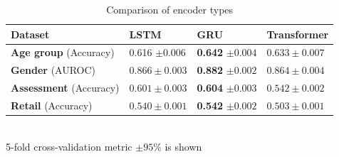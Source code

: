 \documentclass{article}
\begin{document}
\begin{table}
\centering
\caption{Comparison of encoder types}
\begin{tabular}{llll}
\toprule
\textbf{Dataset} & \textbf{LSTM} & \textbf{GRU} & \textbf{Transformer} \\
\midrule
\textbf{Age group} \small{(Accuracy)} & 0.616 $\pm 0.006$ & \textbf{0.642} $\pm 0.004$ & $0.633 \pm 0.007$ \\
\textbf{Gender} \small{(AUROC)} & $0.866 \pm 0.003$ & \textbf{0.882} $\pm 0.002$ & $0.864 \pm 0.004$  \\
\textbf{Assessment} \small{(Accuracy)} & $0.601 \pm 0.003$ & \textbf{0.604} $\pm 0.003$ & $0.542 \pm 0.002$  \\
\textbf{Retail} \small{(Accuracy)} & $0.540 \pm 0.001$ & \textbf{0.542} $\pm 0.002$ & $0.503 \pm 0.001$  \\
\bottomrule
\end{tabular} \\
\small{5-fold cross-validation metric $\pm 95\%$ is shown}
\label{tab-enc-type}
\end{table}
\end{document}
